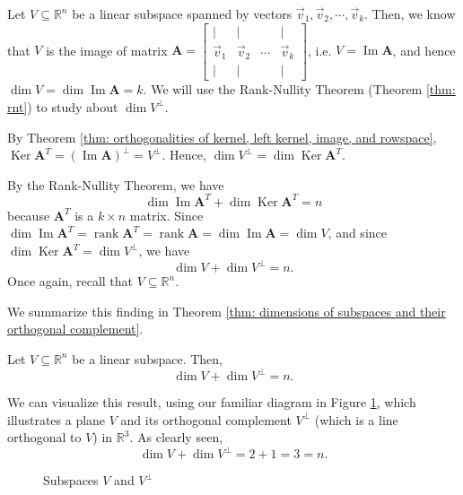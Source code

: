 \documentclass[]{book}
\DeclareMathOperator{\spacedim}{dim}
\DeclareMathOperator{\rank}{rank}
\DeclareMathOperator{\image}{Im}
\DeclareMathOperator{\kernel}{Ker}
\newcommand{\mat}[1]{\ensuremath{\mathbf{#1}}}
\newcommand{\R}{\ensuremath{\mathbb{R}}}
\begin{document}
Let $V \subseteq \R^n$ be a linear subspace spanned by vectors $\vec{v}_1,\vec{v}_2,\cdots,\vec{v}_k$. Then, we know that $V$ is the image of matrix $\mat{A} = \begin{bmatrix} \vert & \vert && \vert \\ \vec{v}_1 & \vec{v}_2 & \cdots & \vec{v}_k \\ \vert & \vert && \vert \end{bmatrix}$, i.e. $V = \image\mat{A}$, and hence $\spacedim V = \spacedim\image\mat{A} = k$. We will use the Rank-Nullity Theorem (Theorem \ref{thm: rnt}) to study about $\dim V^{\perp}$. 

By Theorem \ref{thm: orthogonalities of kernel, left kernel, image, and rowspace}, $\kernel\mat{A}^T = \left(\image\mat{A}\right)^{\perp} = V^{\perp}$. Hence, $\dim V^{\perp} = \spacedim\kernel\mat{A}^T$. 

By the Rank-Nullity Theorem, we have
\[\dim\image\mat{A}^T + \dim\kernel\mat{A}^T = n\] because $\mat{A}^T$ is a $k \times n$ matrix. Since $\dim\image\mat{A}^T = \rank\mat{A}^T = \rank\mat{A} = \dim\image\mat{A} = \dim V$, and since $\dim\kernel\mat{A}^T = \dim V^{\perp}$, we have
\[\dim V + \dim V^{\perp} = n.\] Once again, recall that $V \subseteq \R^n$. 

We summarize this finding in Theorem \ref{thm: dimensions of subspaces and their orthogonal complement}.
\begin{theorem}
    \label{thm: dimensions of subspaces and their orthogonal complement}
    Let $V \subseteq \R^n$ be a linear subspace. Then,
    \[\dim V + \dim V^{\perp} = n.\]
\end{theorem}

We can visualize this result, using our familiar diagram in Figure \ref{fig: V and V-perp}, which illustrates a plane $V$ and its orthogonal complement $V^{\perp}$ (which is a line orthogonal to $V$) in $\R^3$. As clearly seen,
\[\dim V + \dim V^{\perp} = 2 + 1 = 3 = n.\]

\begin{figure}
    \centering
    \caption{Subspaces $V$ and $V^{\perp}$}
    \label{fig: V and V-perp}
\end{figure}
\end{document}
